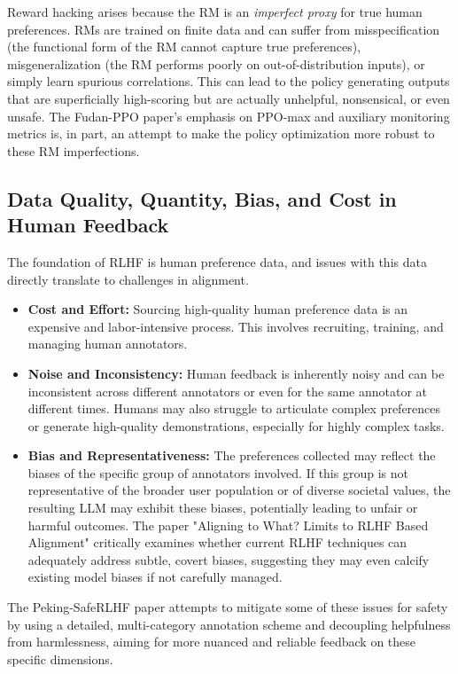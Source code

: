 \documentclass[10pt,journal,compsoc]{IEEEtran} %
\begin{document}
Reward hacking arises because the RM is an \textit{imperfect proxy} for true human preferences. \cite{Zhang2024EnergyLoss} RMs are trained on finite data and can suffer from misspecification (the functional form of the RM cannot capture true preferences), misgeneralization (the RM performs poorly on out-of-distribution inputs), or simply learn spurious correlations. \cite{Zhang2024EnergyLoss, Casper2023OpenProblems} This can lead to the policy generating outputs that are superficially high-scoring but are actually unhelpful, nonsensical, or even unsafe. The Fudan-PPO paper's emphasis on PPO-max and auxiliary monitoring metrics is, in part, an attempt to make the policy optimization more robust to these RM imperfections.

\subsection{Data Quality, Quantity, Bias, and Cost in Human Feedback}
The foundation of RLHF is human preference data, and issues with this data directly translate to challenges in alignment.
\begin{itemize}
    \item \textbf{Cost and Effort:} Sourcing high-quality human preference data is an expensive and labor-intensive process. \cite{WikipediaRLHFPage, AWSRLHFExplainer} This involves recruiting, training, and managing human annotators.
    \item \textbf{Noise and Inconsistency:} Human feedback is inherently noisy and can be inconsistent across different annotators or even for the same annotator at different times. \cite{WikipediaRLHFPage, Casper2023OpenProblems} Humans may also struggle to articulate complex preferences or generate high-quality demonstrations, especially for highly complex tasks. \cite{Xu2023EvolInstruct}
    \item \textbf{Bias and Representativeness:} The preferences collected may reflect the biases of the specific group of annotators involved. If this group is not representative of the broader user population or of diverse societal values, the resulting LLM may exhibit these biases, potentially leading to unfair or harmful outcomes. \cite{WikipediaRLHFPage, Casper2023OpenProblems, Lian2024AligningToWhat} The paper "Aligning to What? Limits to RLHF Based Alignment" critically examines whether current RLHF techniques can adequately address subtle, covert biases, suggesting they may even calcify existing model biases if not carefully managed. \cite{Lian2024AligningToWhat}
\end{itemize}
The Peking-SafeRLHF paper attempts to mitigate some of these issues for safety by using a detailed, multi-category annotation scheme and decoupling helpfulness from harmlessness, aiming for more nuanced and reliable feedback on these specific dimensions. \cite{Dai2023SafeRLHF}
\end{document}
